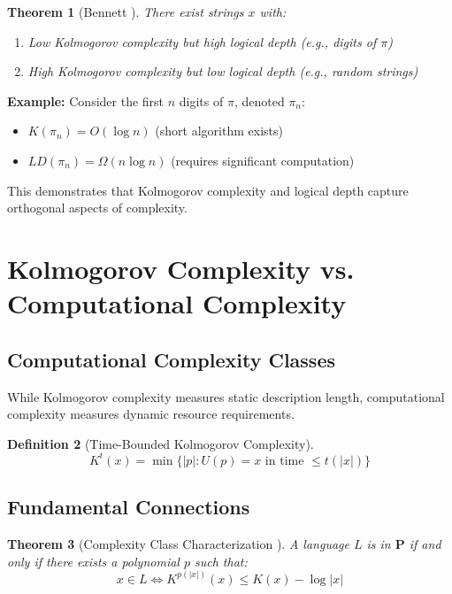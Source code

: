 \documentclass[12pt,a4paper]{report}
\newtheorem{theorem}{Theorem}[chapter]
\newtheorem{definition}[theorem]{Definition}
\begin{document}
\begin{theorem}[Bennett \cite{bennett1988logical}]
There exist strings $x$ with:
\begin{enumerate}
    \item Low Kolmogorov complexity but high logical depth (e.g., digits of $\pi$)
    \item High Kolmogorov complexity but low logical depth (e.g., random strings)
\end{enumerate}
\end{theorem}

\textbf{Example:} Consider the first $n$ digits of $\pi$, denoted $\pi_n$:
\begin{itemize}
    \item $K(\pi_n) = O(\log n)$ (short algorithm exists)
    \item $LD(\pi_n) = \Omega(n \log n)$ (requires significant computation)
\end{itemize}

This demonstrates that Kolmogorov complexity and logical depth capture orthogonal aspects of complexity.

\section{Kolmogorov Complexity vs. Computational Complexity}

\subsection{Computational Complexity Classes}

While Kolmogorov complexity measures static description length, computational complexity measures dynamic resource requirements.

\begin{definition}[Time-Bounded Kolmogorov Complexity]
\begin{equation}
K^t(x) = \min\{|p| : U(p) = x \text{ in time } \leq t(|x|)\}
\end{equation}
\end{definition}

\subsection{Fundamental Connections}

\begin{theorem}[Complexity Class Characterization \cite{allender2006kolmogorov}]
A language $L$ is in $\mathbf{P}$ if and only if there exists a polynomial $p$ such that:
\begin{equation}
x \in L \Leftrightarrow K^{p(|x|)}(x) \leq K(x) - \log|x|
\end{equation}
\end{theorem}
\end{document}
